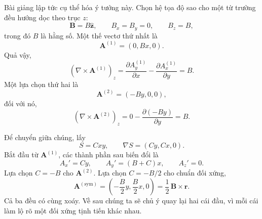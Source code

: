 Bài giảng lập tức cụ thể hóa ý tưởng này. Chọn hệ tọa độ sao cho một từ trường đều hướng dọc theo trục \(z\):
\begin{equation}
  \mathbf B=B\hat{\mathbf z},
  \qquad
  B_x=B_y=0,
  \qquad
  B_z=B,
\end{equation}
trong đó \(B\) là hằng số. Một thế vectơ thứ nhất là
\begin{equation}
  \mathbf A^{(1)}=(0,Bx,0).
\end{equation}
Quả vậy,
\begin{equation}
  (\nabla\times\mathbf A^{(1)})_z
  =
  \frac{\partial A_y^{(1)}}{\partial x}
  -
  \frac{\partial A_x^{(1)}}{\partial y}
  =B.
\end{equation}
Một lựa chọn thứ hai là
\begin{equation}
  \mathbf A^{(2)}=(-By,0,0),
\end{equation}
đối với nó,
\begin{equation}
  (\nabla\times\mathbf A^{(2)})_z
  =
  0-\frac{\partial(-By)}{\partial y}
  =B.
\end{equation}

Để chuyển giữa chúng, lấy
\begin{equation}
  S=Cxy,
  \qquad
  \nabla S=(Cy,Cx,0).
\end{equation}
Bắt đầu từ \(\mathbf A^{(1)}\), các thành phần sau biến đổi là
\begin{equation}
  A_x'=Cy,
  \qquad
  A_y'=(B+C)x,
  \qquad
  A_z'=0.
\end{equation}
Lựa chọn \(C=-B\) cho \(\mathbf A^{(2)}\). Lựa chọn \(C=-B/2\) cho chuẩn đối xứng,
\begin{equation}
  \mathbf A^{(\mathrm{sym})}
  =
  \left(-\frac{B}{2}y,\frac{B}{2}x,0\right)
  =
  \frac12\,\mathbf B\times\mathbf r.
\end{equation}
Cả ba đều có cùng xoáy. Về sau chúng ta sẽ chủ ý quay lại hai cái đầu, vì mỗi cái làm lộ rõ một đối xứng tịnh tiến khác nhau.

\begin{classroomqa}
\end{classroomqa}

